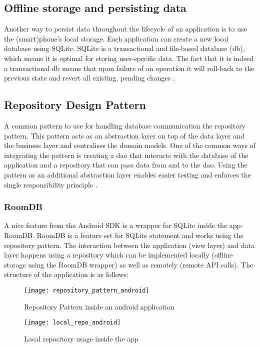 \subsection{Offline storage and persisting data}
Another way to persist data throughout the lifecycle of an application is to use the (smart)phone's local storage. Each application can create a new local database using SQLite. SQLite is a transactional and file-based database (db), which means it is optimal for storing user-specific data. The fact that it is indeed a transactional db means that upon failure of an operation it will roll-back to the previous state and revert all existing, pending changes \cite{TutorialsPoint2019}.
\subsection{Repository Design Pattern}
A common pattern to use for handling database communication the repository pattern. This pattern acts as an abstraction layer on top of the data layer and the business layer and centralises the domain models. One of the common ways of integrating the pattern is creating a \acrfull{dao} that interacts with the database of the application and a repository that can pass data from and to the \acrshort{dao}. Using the pattern as an additional abstraction layer enables easier testing and enforces the single responsibility principle \cite{Per-ErikBergman2017} \cite{NahidulHasan2018}.
\subsubsection{RoomDB}
A nice feature from the Android SDK is a wrapper for SQLite inside the app: RoomDB. RoomDB is a feature set for SQLite statement and works using the repository pattern. The interaction between the application (view layer) and data layer happens using a repository which can be implemented locally (offline storage using the RoomDB wrapper) as well as remotely (remote API calls). The structure of the application is as follows:
\begin{figure}[h!]
\texttt{[image: repository\_pattern\_android]}
\centering
\caption{Repository Pattern inside an android application~\cite{EslamHussein2018}}
\end{figure}
\begin{figure}[h!]
\texttt{[image: local\_repo\_android]}
\centering
\caption{Local repository usage inside the app~\cite{Unknown2018}}
\end{figure}
